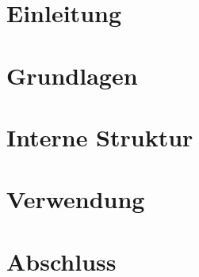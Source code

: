 \chapter{Einleitung}
\label{cha:einleitung}
	
	
\chapter{Grundlagen}
\label{cha:grundlagen}
	
	
\chapter{Interne Struktur}
\label{cha:interne-struktur}
	
	
\chapter{Verwendung}
\label{cha:verwendung}
	

\chapter{Abschluss}
\label{cha:abschluss}
	
